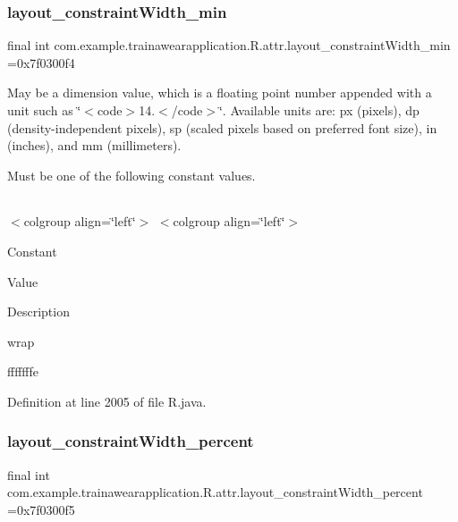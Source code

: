 \subsubsection{\texorpdfstring{layout\_constraintWidth\_min}{layout\_constraintWidth\_min}}
{\footnotesize\ttfamily final int com.\+example.\+trainawearapplication.\+R.\+attr.\+layout\+\_\+constraint\+Width\+\_\+min =0x7f0300f4\hspace{0.3cm}{\ttfamily [static]}}

May be a dimension value, which is a floating point number appended with a unit such as \char`\"{}$<$code$>$14.\+5sp$<$/code$>$\char`\"{}. Available units are\+: px (pixels), dp (density-\/independent pixels), sp (scaled pixels based on preferred font size), in (inches), and mm (millimeters). 

Must be one of the following constant values.

\tabulinesep=1mm
\begin{longtabu}spread 0pt [c]{*{0}{|X[-1]}|}
\hline
\end{longtabu}
$<$colgroup align=\char`\"{}left\char`\"{}$>$ $<$colgroup align=\char`\"{}left\char`\"{}$>$ 

Constant

Value

Description 

wrap

fffffffe

Definition at line 2005 of file R.\+java.

\mbox{\label{classcom_1_1example_1_1trainawearapplication_1_1_r_1_1attr_adbbaf014b8b3f4a8b2b1728922ecebcc}} 
\subsubsection{\texorpdfstring{layout\_constraintWidth\_percent}{layout\_constraintWidth\_percent}}
{\footnotesize\ttfamily final int com.\+example.\+trainawearapplication.\+R.\+attr.\+layout\+\_\+constraint\+Width\+\_\+percent =0x7f0300f5\hspace{0.3cm}{\ttfamily [static]}}

